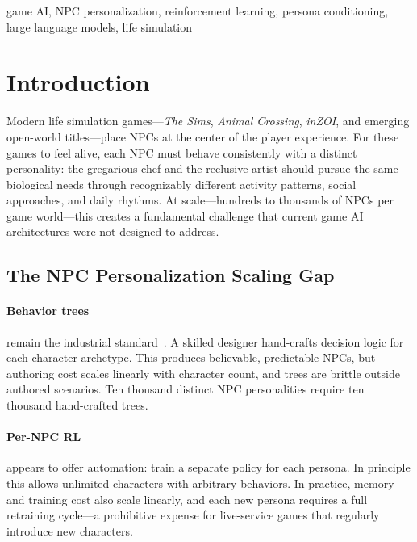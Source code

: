 \documentclass[conference]{IEEEtran}
\begin{document}
\begin{IEEEkeywords}
game AI, NPC personalization, reinforcement learning, persona conditioning,
large language models, life simulation
\end{IEEEkeywords}

\section{Introduction}
\label{sec:intro}

Modern life simulation games---\textit{The Sims}, \textit{Animal Crossing},
\textit{inZOI}, and emerging open-world titles---place NPCs at the center of
the player experience. For these games to feel alive, each NPC must behave
consistently with a distinct personality: the gregarious chef and the reclusive
artist should pursue the same biological needs through recognizably different
activity patterns, social approaches, and daily rhythms. At scale---hundreds to
thousands of NPCs per game world---this creates a fundamental challenge that
current game AI architectures were not designed to address.

\subsection{The NPC Personalization Scaling Gap}

\paragraph{Behavior trees} remain the industrial standard~\cite{yannakakis2018ai,colledanchise2018bt}.
A skilled designer hand-crafts decision logic for each character archetype.
This produces believable, predictable NPCs, but authoring cost scales linearly
with character count, and trees are brittle outside authored scenarios.
Ten thousand distinct NPC personalities require ten thousand hand-crafted trees.

\paragraph{Per-NPC RL} appears to offer automation: train a separate policy for
each persona. In principle this allows unlimited characters with arbitrary
behaviors. In practice, memory and training cost also scale linearly, and each
new persona requires a full retraining cycle---a prohibitive expense for
live-service games that regularly introduce new characters.
\end{document}
